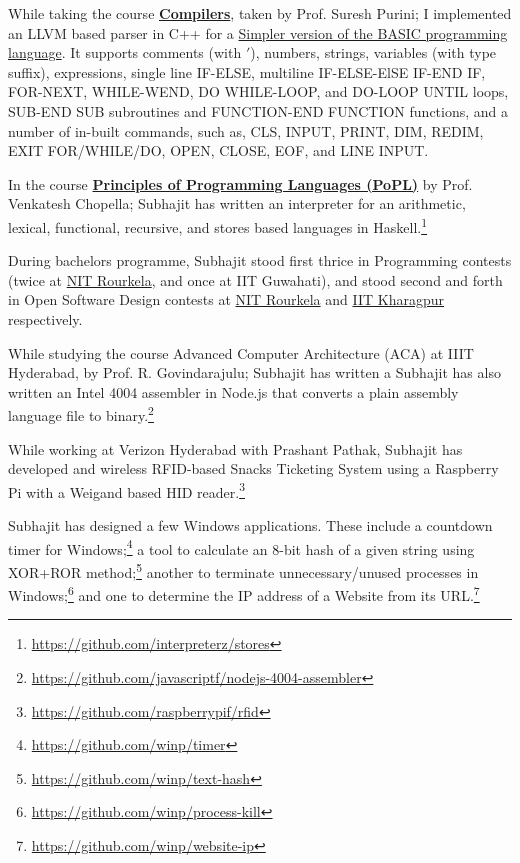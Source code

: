 While taking the course \textbf{\href{https://github.com/iiithf/compilers}{Compilers}}, taken by Prof. Suresh Purini; I implemented an LLVM based parser in C++ for a \href{https://github.com/cppf/basic-parser}{Simpler version of the BASIC programming language}. It supports comments (with $'$), numbers, strings, variables (with type suffix), expressions, single line IF-ELSE, multiline IF-ELSE-ElSE IF-END IF, FOR-NEXT, WHILE-WEND, DO WHILE-LOOP, and DO-LOOP UNTIL loops, SUB-END SUB subroutines and FUNCTION-END FUNCTION functions, and a number of in-built commands, such as, CLS, INPUT, PRINT, DIM, REDIM, EXIT FOR/WHILE/DO, OPEN, CLOSE, EOF, and LINE INPUT.

In the course \textbf{\href{https://github.com/iiithf/principles-of-programming-languages}{Principles of Programming Languages (PoPL)}} by Prof. Venkatesh Chopella; Subhajit has written an interpreter for an arithmetic, lexical, functional, recursive, and stores based languages in Haskell.\footnote{\url{https://github.com/interpreterz/stores}}

During bachelors programme, Subhajit stood first thrice in Programming contests (twice at \href{https://github.com/moocf/code-rage}{NIT Rourkela}, and once at IIT Guwahati), and stood second and forth in Open Software Design contests at \href{https://github.com/moocf/programvare-promoteur}{NIT Rourkela} and \href{https://github.com/moocf/open-soft}{IIT Kharagpur} respectively.


While studying the course Advanced Computer Architecture (ACA) at IIIT Hyderabad, by Prof. R. Govindarajulu; Subhajit has written a  Subhajit has also written an Intel 4004 assembler in Node.js that converts a plain assembly language file to binary.\footnote{\url{https://github.com/javascriptf/nodejs-4004-assembler}}


While working at Verizon Hyderabad with Prashant Pathak, Subhajit has developed and wireless RFID-based Snacks Ticketing System using a Raspberry Pi with a Weigand based HID reader.\footnote{\url{https://github.com/raspberrypif/rfid}}





Subhajit has designed a few Windows applications. These include a countdown timer for Windows;\footnote{\url{https://github.com/winp/timer}} a tool to calculate an 8-bit hash of a given string using XOR+ROR method;\footnote{\url{https://github.com/winp/text-hash}} another to terminate unnecessary/unused processes in Windows;\footnote{\url{https://github.com/winp/process-kill}} and one to determine the IP address of a Website from its URL.\footnote{\url{https://github.com/winp/website-ip}}

